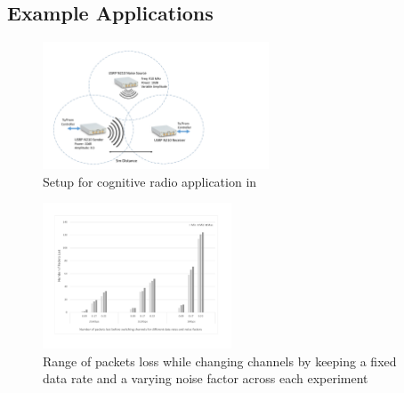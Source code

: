 \subsection{Example Applications}
  

\begin{figure}[t]
  \centering
  \includegraphics[width=0.6\textwidth]{figures/Setup.pdf}
  \caption{Setup for cognitive radio application in \crossflow}
  \label{fig:setup}
\end{figure}

\begin{figure}[t]
  \centering
  \includegraphics[width=0.5\textwidth]{figures/Overhead.pdf}
  \caption{Range of packets loss while changing channels by keeping a fixed data rate and a varying noise factor across each experiment}
  \label{fig:overhead}
\end{figure}

